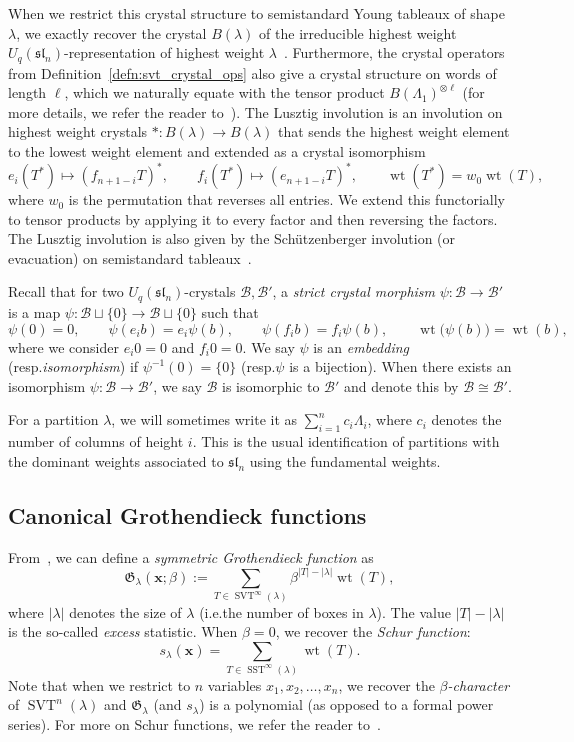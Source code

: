 \documentclass[10pt]{amsart}
\theoremstyle{definition}
\providecommand{\ie}{i.e.}
\providecommand{\resp}{resp.}
\providecommand{\G}{\mathfrak G}
\renewcommand{\G}{\mathfrak{G}}  %
\newcommand{\xx}{\mathbf{x}}
\newcommand{\iso}{\cong}
\newcommand{\abs}[1]{\lvert #1 \rvert}
\newcommand{\fsl}{\mathfrak{sl}}
\DeclareMathOperator{\wt}{wt} %
\DeclareMathOperator{\ssyt}{SST} %
\DeclareMathOperator{\svt}{SVT} %
\newcommand{\mcB}{\mathcal{B}}
\newcommand{\defn}[1]{{\color{darkred}\emph{#1}}} %
\begin{document}
When we restrict this crystal structure to semistandard Young tableaux of shape $\lambda$, we exactly recover the crystal $B(\lambda)$ of the irreducible highest weight $U_q(\fsl_n)$-representation of highest weight $\lambda$~\cite{K90,K91}. Furthermore, the crystal operators from Definition~\ref{defn:svt_crystal_ops} also give a crystal structure on words of length $\ell$, which we naturally equate with the tensor product $B(\Lambda_1)^{\otimes \ell}$ (for more details, we refer the reader to~\cite{BS17}).
The Lusztig involution is an involution on highest weight crystals $\ast \colon B(\lambda) \to B(\lambda)$ that sends the highest weight element to the lowest weight element and extended as a crystal isomorphism
\[
e_i(T^*) \mapsto (f_{n+1-i}T)^*,
\qquad
f_i(T^*) \mapsto (e_{n+1-i}T)^*,
\qquad
\wt(T^*) = w_0 \wt(T),
\]
where $w_0$ is the permutation that reverses all entries. We extend this functorially to tensor products by applying it to every factor and then reversing the factors. The Lusztig involution is also given by the Sch{\"u}tzenberger involution (or evacuation) on semistandard tableaux~\cite{Lenart07}.

Recall that for two $U_q(\fsl_n)$-crystals $\mcB, \mcB'$, a \defn{strict crystal morphism} $\psi \colon \mcB \to \mcB'$ is a map $\psi \colon \mcB \sqcup \{0\} \to \mcB \sqcup \{0\}$ such that
\[
\psi(0) = 0,
\qquad
\psi(e_i b) = e_i \psi(b),
\qquad
\psi(f_i b) = f_i \psi(b),
\qquad
\wt\bigl( \psi(b) \bigr) = \wt(b),
\]
where we consider $e_i 0 = 0$ and $f_i 0 = 0$.
We say $\psi$ is an \defn{embedding} (\resp \defn{isomorphism}) if $\psi^{-1}(0) = \{0\}$ (\resp $\psi$ is a bijection).
When there exists an isomorphism $\psi \colon \mcB \to \mcB'$, we say $\mcB$ is isomorphic to $\mcB'$ and denote this by $\mcB \iso \mcB'$.

For a partition $\lambda$, we will sometimes write it as $\sum_{i=1}^n c_i \Lambda_i$, where $c_i$ denotes the number of columns of height $i$.
This is the usual identification of partitions with the dominant weights associated to $\fsl_n$ using the fundamental weights.
\subsection{Canonical Grothendieck functions}

From~\cite{Buch02}, we can define a \defn{symmetric Grothendieck function} as
\[
\G_{\lambda}(\xx; \beta) := \sum_{T \in \svt^{\infty}(\lambda)} \beta^{\abs{T}-\abs{\lambda}} \wt(T),
\]
where $\abs{\lambda}$ denotes the size of $\lambda$ (\ie the number of boxes in $\lambda$).
The value $\abs{T} - \abs{\lambda}$ is the so-called \defn{excess} statistic.
When $\beta = 0$, we recover the \defn{Schur function}:
\[
s_{\lambda}(\xx) = \sum_{T \in \ssyt^{\infty}(\lambda)} \wt(T).
\]
Note that when we restrict to $n$ variables $x_1, x_2, \dotsc, x_n$, we recover the \defn{$\beta$-character} of $\svt^n(\lambda)$ and $\G_{\lambda}$ (and $s_{\lambda}$) is a polynomial (as opposed to a formal power series).
For more on Schur functions, we refer the reader to~\cite[Ch.~7]{ECII}.
\end{document}
